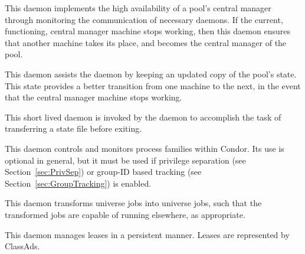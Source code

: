 \begin{description}
\item[\Condor{had}] This daemon
implements the high availability of a pool's central manager
through monitoring the communication of necessary daemons.
If the current, functioning, central manager machine
stops working, then this daemon ensures that another 
machine takes its place, and becomes the central manager of
the pool.

\item[\Condor{replication}] This daemon
assists the  daemon by keeping an updated copy of the
pool's state. This state provides a better transition
from one machine to the next, in the event 
that the central manager machine stops working.

\item[\Condor{transferer}] This short lived daemon is invoked by
the  daemon to accomplish the task of transferring
a state file before exiting.

\item[\Condor{procd}] This daemon
controls and monitors process families within Condor. Its use
is optional in general, but it must be used if privilege separation
(see Section~\ref{sec:PrivSep}) or group-ID based tracking (see
Section~\ref{sec:GroupTracking}) is enabled.

\item[\Condor{job\_router}] This daemon 
transforms  universe jobs into 
universe jobs, such that the transformed jobs are capable
of running elsewhere, as appropriate.

\item[\Condor{lease\_manager}] This daemon 
manages leases in a persistent manner.
Leases are represented by ClassAds.


\end{description}
